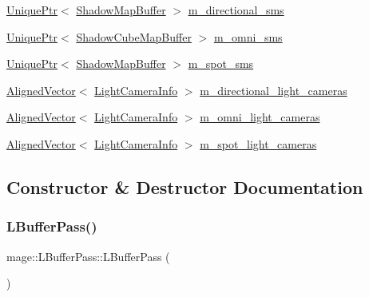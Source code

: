 \begin{DoxyCompactItemize}
\item 
\hyperlink{namespacemage_a3316d7143a973e37adf1110f2e80ca31}{Unique\+Ptr}$<$ \hyperlink{structmage_1_1_shadow_map_buffer}{Shadow\+Map\+Buffer} $>$ \hyperlink{structmage_1_1_l_buffer_pass_ab1372d2fc5e0e716565f8d3d8eb6db97}{m\+\_\+directional\+\_\+sms}
\item 
\hyperlink{namespacemage_a3316d7143a973e37adf1110f2e80ca31}{Unique\+Ptr}$<$ \hyperlink{structmage_1_1_shadow_cube_map_buffer}{Shadow\+Cube\+Map\+Buffer} $>$ \hyperlink{structmage_1_1_l_buffer_pass_a083245bbfa560e2e16fd829a30ad857d}{m\+\_\+omni\+\_\+sms}
\item 
\hyperlink{namespacemage_a3316d7143a973e37adf1110f2e80ca31}{Unique\+Ptr}$<$ \hyperlink{structmage_1_1_shadow_map_buffer}{Shadow\+Map\+Buffer} $>$ \hyperlink{structmage_1_1_l_buffer_pass_a348d64fd92b6198663494d521edcdf6b}{m\+\_\+spot\+\_\+sms}
\item 
\hyperlink{namespacemage_a8664bfb5ce2179fc64eae9f82c8a5ba8}{Aligned\+Vector}$<$ \hyperlink{structmage_1_1_light_camera_info}{Light\+Camera\+Info} $>$ \hyperlink{structmage_1_1_l_buffer_pass_ab6eead232cc2886b1d29e9f6cc45b16d}{m\+\_\+directional\+\_\+light\+\_\+cameras}
\item 
\hyperlink{namespacemage_a8664bfb5ce2179fc64eae9f82c8a5ba8}{Aligned\+Vector}$<$ \hyperlink{structmage_1_1_light_camera_info}{Light\+Camera\+Info} $>$ \hyperlink{structmage_1_1_l_buffer_pass_ae8474ced9c3b762ffba3f1d859b9396a}{m\+\_\+omni\+\_\+light\+\_\+cameras}
\item 
\hyperlink{namespacemage_a8664bfb5ce2179fc64eae9f82c8a5ba8}{Aligned\+Vector}$<$ \hyperlink{structmage_1_1_light_camera_info}{Light\+Camera\+Info} $>$ \hyperlink{structmage_1_1_l_buffer_pass_ae09a921906a3b53074b9d08c1594928f}{m\+\_\+spot\+\_\+light\+\_\+cameras}
\end{DoxyCompactItemize}


\subsection{Constructor \& Destructor Documentation}
\hypertarget{structmage_1_1_l_buffer_pass_acde2812780af700501ca945d62ed3dcc}{}\label{structmage_1_1_l_buffer_pass_acde2812780af700501ca945d62ed3dcc} 
\subsubsection{\texorpdfstring{L\+Buffer\+Pass()}{LBufferPass()}\hspace{0.1cm}{\footnotesize\ttfamily [1/3]}}
{\footnotesize\ttfamily mage\+::\+L\+Buffer\+Pass\+::\+L\+Buffer\+Pass (\begin{DoxyParamCaption}{ }\end{DoxyParamCaption})}

